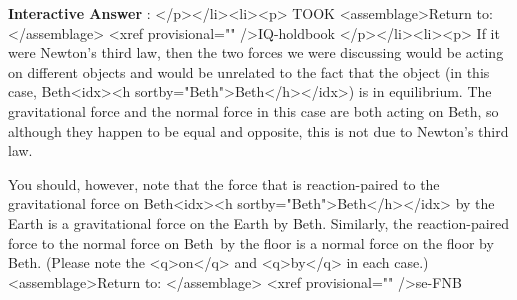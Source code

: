 \documentclass[11pt,letter,openany,makeidx]{book}
\newcounter{AtIQ}
\renewcommand{\theAtIQ}{Answer \arabic{AtIQ}}
\newenvironment{AIQ}{\begin{list}{\textbf{Interactive \theAtIQ}:}{\usecounter{AtIQ} \leftmargin 12pt}}{\end{list}}
\newcommand{\studentB}{Beth}        \newcommand{\massB}{\mbox{$75.0\unit{kg}$}}
\begin{document}
\begin{AIQ}
</p></li><li><p>\label{A-two} TOOK  <assemblage>Return to: </assemblage> <xref provisional="" />{IQ-holdbook}
</p></li><li><p>\label{A-third} If it were Newton's third law, then the two forces we were discussing would be acting on different objects and would be unrelated to the fact that the object (in this case, \studentB<idx><h sortby="\studentB">\studentB</h></idx>) is in equilibrium.  The gravitational force and the normal force in this case are both acting on \studentB, so although they happen to be equal and opposite, this is not due to Newton's third law.

    You should, however, note that the force that is reaction-paired to the gravitational force on \studentB<idx><h sortby="\studentB">\studentB</h></idx> by the Earth is a gravitational force on the Earth by \studentB.  Similarly, the reaction-paired force to the normal force on \studentB\ by the floor is a normal force on the floor by \studentB.  (Please note the <q>on</q> and <q>by</q> in each case.) <assemblage>Return to: </assemblage> <xref provisional="" />{se-FNB}


\end{AIQ}
\end{document}
